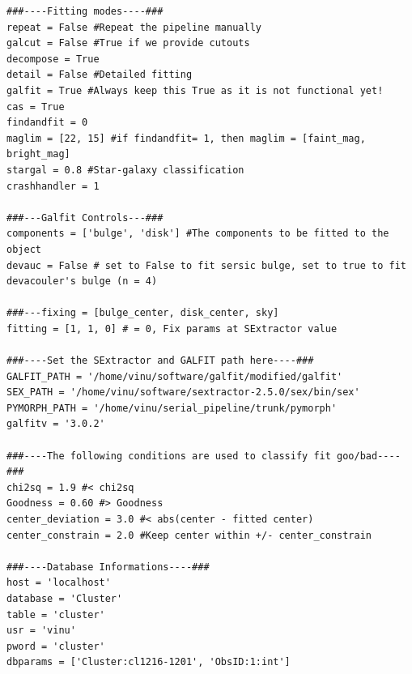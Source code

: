 \documentclass[a4paper,10pt]{article}
\begin{document}
\begin{footnotesize}
\begin{verbatim}
###----Fitting modes----###
repeat = False #Repeat the pipeline manually
galcut = False #True if we provide cutouts
decompose = True
detail = False #Detailed fitting
galfit = True #Always keep this True as it is not functional yet!
cas = True
findandfit = 0
maglim = [22, 15] #if findandfit= 1, then maglim = [faint_mag, bright_mag]
stargal = 0.8 #Star-galaxy classification
crashhandler = 1

###---Galfit Controls---###
components = ['bulge', 'disk'] #The components to be fitted to the object
devauc = False # set to False to fit sersic bulge, set to true to fit devacouler's bulge (n = 4)

###---fixing = [bulge_center, disk_center, sky]
fitting = [1, 1, 0] # = 0, Fix params at SExtractor value

###----Set the SExtractor and GALFIT path here----###
GALFIT_PATH = '/home/vinu/software/galfit/modified/galfit'
SEX_PATH = '/home/vinu/software/sextractor-2.5.0/sex/bin/sex'
PYMORPH_PATH = '/home/vinu/serial_pipeline/trunk/pymorph'
galfitv = '3.0.2'

###----The following conditions are used to classify fit goo/bad----###
chi2sq = 1.9 #< chi2sq
Goodness = 0.60 #> Goodness
center_deviation = 3.0 #< abs(center - fitted center)
center_constrain = 2.0 #Keep center within +/- center_constrain

###----Database Informations----###
host = 'localhost'
database = 'Cluster'
table = 'cluster'
usr = 'vinu'
pword = 'cluster'
dbparams = ['Cluster:cl1216-1201', 'ObsID:1:int']
\end{verbatim}
\end{footnotesize}
\end{document}
